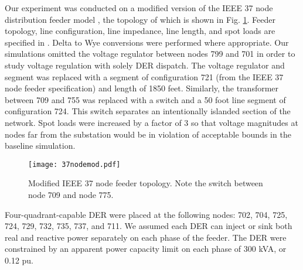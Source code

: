 Our experiment was conducted on a modified version of the IEEE 37 node distribution feeder model \cite{IEEEtestfeeder}, the topology of which is shown in Fig. \ref{fig:37nodemod}. Feeder topology, line configuration, line impedance, line length, and spot loads are specified in \cite{IEEEtestfeeder}. Delta to Wye conversions were performed where appropriate. Our simulations omitted the voltage regulator between nodes 799 and 701 in order to study voltage regulation with solely DER dispatch. The voltage regulator and segment was replaced with a segment of configuration 721 (from the IEEE 37 node feeder specification) and length of 1850 feet. Similarly, the transformer between 709 and 755 was replaced with a switch and a 50 foot line segment of configuration 724. This switch separates an intentionally islanded section of the network. Spot loads were increased by a factor of 3 so that voltage magnitudes at nodes far from the substation would be in violation of acceptable bounds in the baseline simulation.

\begin{figure}[t]
	\centering
    \texttt{[image: 37nodemod.pdf]}
    \caption{Modified IEEE 37 node feeder topology. Note the switch between node 709 and node 775.}
    \label{fig:37nodemod}
\end{figure}

Four-quadrant-capable DER were placed at the following nodes: 702, 704, 725, 724, 729, 732, 735, 737, and 711. We assumed each DER can inject or sink both real and reactive power separately on each phase of the feeder.  The DER were constrained by an apparent power capacity limit on each phase of 300 kVA, or 0.12 pu.

